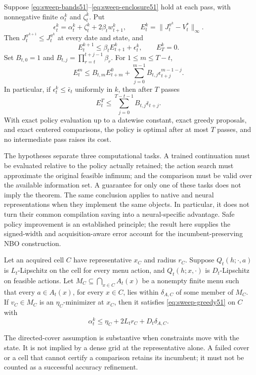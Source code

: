 \begin{theorem}
\label{thm:finite-sweeps51}
Suppose \eqref{eq:sweep-bands51}--\eqref{eq:sweep-enclosure51} hold at each
pass, with nonnegative finite $\alpha_t^k$ and $\zeta_t^k$. Put
\[
 \epsilon_t^k=\alpha_t^k+\zeta_t^k+2\beta_tw_{t+1}^k,
 \qquad E_t^k=\|J_t^{\pi^k}-V_t^*\|_\infty.
\]
Then $J_t^{\pi^{k+1}}\leq J_t^{\pi^k}$ at every date and state, and
\begin{equation}\label{eq:sweep-recursion51}
 E_t^{k+1}\leq\beta_t E_{t+1}^k+\epsilon_t^k,
 \qquad E_T^k=0.
\end{equation}
Set $B_{t,0}=1$ and $B_{t,j}=\prod_{r=t}^{t+j-1}\beta_r$.
For $1\leq m\leq T-t$,
\begin{equation}\label{eq:sweep-unroll51}
 E_t^m\leq B_{t,m}E_{t+m}^0+
 \sum_{j=0}^{m-1}B_{t,j}\epsilon_{t+j}^{m-1-j}.
\end{equation}
In particular, if $\epsilon_t^k\leq\bar\epsilon_t$ uniformly in $k$,
then after $T$ passes
\begin{equation}\label{eq:sweep-final51}
 E_t^T\leq\sum_{j=0}^{T-t-1}B_{t,j}\bar\epsilon_{t+j}.
\end{equation}
With exact policy evaluation up to a datewise constant, exact greedy
proposals, and exact centered comparisons, the policy is optimal after at
most $T$ passes, and no intermediate pass raises its cost.
\end{theorem}

The hypotheses separate three computational tasks. A trained continuation
must be evaluated relative to the policy actually retained; the action
search must approximate the original feasible infimum; and the comparison
must be valid over the available information set. A guarantee for only one
of these tasks does not imply the theorem. The same conclusion applies to
native and neural representations when they implement the same objects.
In particular, it does not turn their common compilation saving into a
neural-specific advantage. Safe policy improvement is an established
principle; the result here supplies the signed-width and acquisition-aware
error account for the incumbent-preserving NBO construction.

\begin{proposition}
\label{prop:cell-greedy51}
Let an acquired cell $C$ have representative $x_C$ and radius $r_C$.
Suppose $Q_t(h;\cdot,a)$ is $L_t$-Lipschitz on the cell for every menu
action, and $Q_t(h;x,\cdot)$ is $D_t$-Lipschitz on feasible actions.
Let $M_C\subseteq\bigcap_{x\in C}A_t(x)$ be a nonempty finite menu such that every
$a\in A_t(x)$, for every $x\in C$, lies within $\delta_{A,C}$ of some
member of $M_C$. If $v_C\in M_C$ is an $\eta_C$-minimizer at $x_C$,
then it satisfies \eqref{eq:sweep-greedy51} on $C$ with
\[
 \alpha_t^k\leq \eta_C+2L_tr_C+D_t\delta_{A,C}.
\]
\end{proposition}
The directed-cover assumption is substantive when constraints move with the
state. It is not implied by a dense grid at the representative alone. A
failed cover or a cell that cannot certify a comparison retains its incumbent;
it must not be counted as a successful accuracy refinement.

